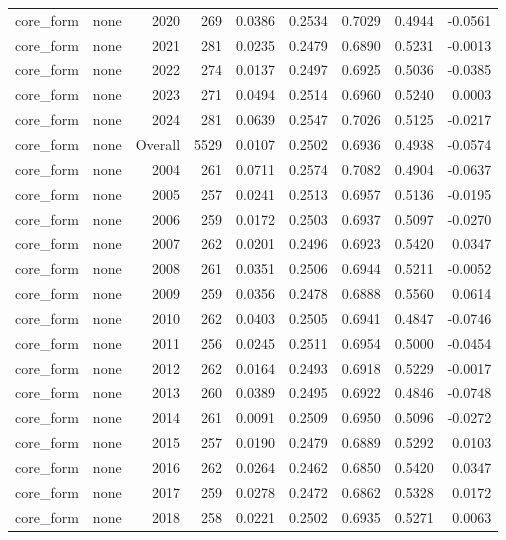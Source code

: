 \begin{table}[t]
\begin{tabular}{@{} l l r r r r r r r @{} }
      core\_form & none & 2020 & 269 & 0.0386 & 0.2534 & 0.7029 & 0.4944 & -0.0561 \\
      core\_form & none & 2021 & 281 & 0.0235 & 0.2479 & 0.6890 & 0.5231 & -0.0013 \\
      core\_form & none & 2022 & 274 & 0.0137 & 0.2497 & 0.6925 & 0.5036 & -0.0385 \\
      core\_form & none & 2023 & 271 & 0.0494 & 0.2514 & 0.6960 & 0.5240 & 0.0003 \\
      core\_form & none & 2024 & 281 & 0.0639 & 0.2547 & 0.7026 & 0.5125 & -0.0217 \\
      core\_form & none & Overall & 5529 & 0.0107 & 0.2502 & 0.6936 & 0.4938 & -0.0574 \\
      core\_form & none & 2004 & 261 & 0.0711 & 0.2574 & 0.7082 & 0.4904 & -0.0637 \\
      core\_form & none & 2005 & 257 & 0.0241 & 0.2513 & 0.6957 & 0.5136 & -0.0195 \\
      core\_form & none & 2006 & 259 & 0.0172 & 0.2503 & 0.6937 & 0.5097 & -0.0270 \\
      core\_form & none & 2007 & 262 & 0.0201 & 0.2496 & 0.6923 & 0.5420 & 0.0347 \\
      core\_form & none & 2008 & 261 & 0.0351 & 0.2506 & 0.6944 & 0.5211 & -0.0052 \\
      core\_form & none & 2009 & 259 & 0.0356 & 0.2478 & 0.6888 & 0.5560 & 0.0614 \\
      core\_form & none & 2010 & 262 & 0.0403 & 0.2505 & 0.6941 & 0.4847 & -0.0746 \\
      core\_form & none & 2011 & 256 & 0.0245 & 0.2511 & 0.6954 & 0.5000 & -0.0454 \\
      core\_form & none & 2012 & 262 & 0.0164 & 0.2493 & 0.6918 & 0.5229 & -0.0017 \\
      core\_form & none & 2013 & 260 & 0.0389 & 0.2495 & 0.6922 & 0.4846 & -0.0748 \\
      core\_form & none & 2014 & 261 & 0.0091 & 0.2509 & 0.6950 & 0.5096 & -0.0272 \\
      core\_form & none & 2015 & 257 & 0.0190 & 0.2479 & 0.6889 & 0.5292 & 0.0103 \\
      core\_form & none & 2016 & 262 & 0.0264 & 0.2462 & 0.6850 & 0.5420 & 0.0347 \\
      core\_form & none & 2017 & 259 & 0.0278 & 0.2472 & 0.6862 & 0.5328 & 0.0172 \\
      core\_form & none & 2018 & 258 & 0.0221 & 0.2502 & 0.6935 & 0.5271 & 0.0063 \\

\end{tabular}
\end{table}
